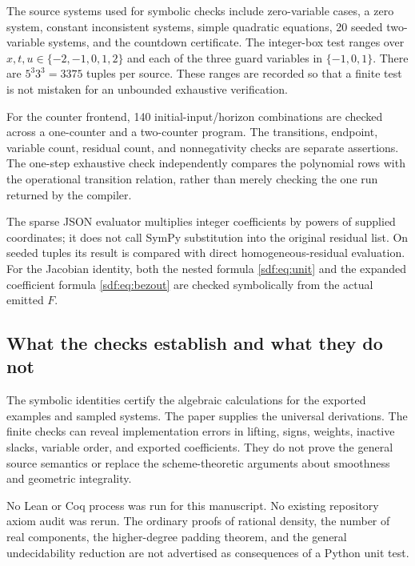 \documentclass[11pt,a4paper]{article}
\theoremstyle{definition}
\theoremstyle{remark}
\begin{document}
The source systems used for symbolic checks include zero-variable cases,
a zero system, constant inconsistent systems, simple quadratic equations,
20 seeded two-variable systems, and the countdown certificate. The
integer-box test ranges over $x,t,u\in\{-2,-1,0,1,2\}$ and each of the
three guard variables in $\{-1,0,1\}$. There are $5^3 3^3=3375$ tuples
per source. These ranges are recorded so that a finite test is not mistaken
for an unbounded exhaustive verification.

For the counter frontend, 140 initial-input/horizon combinations are
checked across a one-counter and a two-counter program. The transitions,
endpoint, variable count, residual count, and nonnegativity checks are
separate assertions. The one-step exhaustive check independently compares
the polynomial rows with the operational transition relation, rather than
merely checking the one run returned by the compiler.

The sparse JSON evaluator multiplies integer coefficients by powers of
supplied coordinates; it does not call SymPy substitution into the original
residual list. On seeded tuples its result is compared with direct
homogeneous-residual evaluation. For the Jacobian identity, both the nested
formula \eqref{sdf:eq:unit} and the expanded coefficient formula
\eqref{sdf:eq:bezout} are checked symbolically from the actual emitted $F$.

\subsection{What the checks establish and what they do not}

The symbolic identities certify the algebraic calculations for the exported
examples and sampled systems. The paper supplies the universal derivations.
The finite checks can reveal implementation errors in lifting, signs,
weights, inactive slacks, variable order, and exported coefficients. They
do not prove the general source semantics or replace the scheme-theoretic
arguments about smoothness and geometric integrality.

No Lean or Coq process was run for this manuscript. No existing repository
axiom audit was rerun. The ordinary proofs of rational density, the number
of real components, the higher-degree padding theorem, and the general
undecidability reduction are not advertised as consequences of a Python
unit test.
\end{document}
